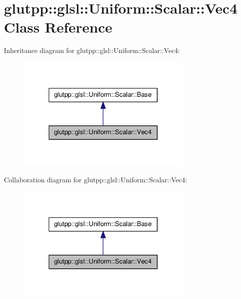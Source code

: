 \hypertarget{classglutpp_1_1glsl_1_1Uniform_1_1Scalar_1_1Vec4}{\section{glutpp\-:\-:glsl\-:\-:\-Uniform\-:\-:\-Scalar\-:\-:\-Vec4 \-Class \-Reference}
\label{classglutpp_1_1glsl_1_1Uniform_1_1Scalar_1_1Vec4}
}


\-Inheritance diagram for glutpp\-:\-:glsl\-:\-:\-Uniform\-:\-:\-Scalar\-:\-:\-Vec4\-:
\nopagebreak
\begin{figure}[H]
\begin{center}
\leavevmode
\includegraphics[width=246pt]{classglutpp_1_1glsl_1_1Uniform_1_1Scalar_1_1Vec4__inherit__graph}
\end{center}
\end{figure}


\-Collaboration diagram for glutpp\-:\-:glsl\-:\-:\-Uniform\-:\-:\-Scalar\-:\-:\-Vec4\-:
\nopagebreak
\begin{figure}[H]
\begin{center}
\leavevmode
\includegraphics[width=246pt]{classglutpp_1_1glsl_1_1Uniform_1_1Scalar_1_1Vec4__coll__graph}
\end{center}
\end{figure}
